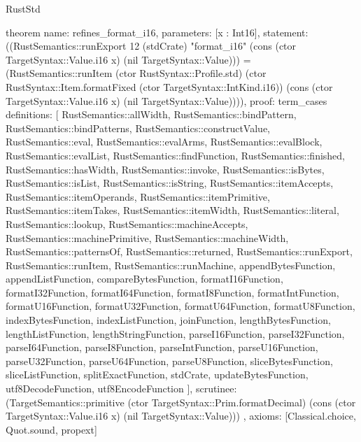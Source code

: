 \begin{lexlean}{RustStd}
\begin{semanticmodule}
theorem{
  name: refines_format_i16,
  parameters: [x : Int16],
  statement: ((RustSemantics::runExport 12 (stdCrate) "format_i16" (cons (ctor TargetSyntax::Value.i16 x) (nil TargetSyntax::Value))) = (RustSemantics::runItem (ctor RustSyntax::Profile.std) (ctor RustSyntax::Item.formatFixed (ctor TargetSyntax::IntKind.i16)) (cons (ctor TargetSyntax::Value.i16 x) (nil TargetSyntax::Value)))),
  proof: term_cases{
    definitions: [
      RustSemantics::allWidth,
      RustSemantics::bindPattern,
      RustSemantics::bindPatterns,
      RustSemantics::constructValue,
      RustSemantics::eval,
      RustSemantics::evalArms,
      RustSemantics::evalBlock,
      RustSemantics::evalList,
      RustSemantics::findFunction,
      RustSemantics::finished,
      RustSemantics::hasWidth,
      RustSemantics::invoke,
      RustSemantics::isBytes,
      RustSemantics::isList,
      RustSemantics::isString,
      RustSemantics::itemAccepts,
      RustSemantics::itemOperands,
      RustSemantics::itemPrimitive,
      RustSemantics::itemTakes,
      RustSemantics::itemWidth,
      RustSemantics::literal,
      RustSemantics::lookup,
      RustSemantics::machineAccepts,
      RustSemantics::machinePrimitive,
      RustSemantics::machineWidth,
      RustSemantics::patternsOf,
      RustSemantics::returned,
      RustSemantics::runExport,
      RustSemantics::runItem,
      RustSemantics::runMachine,
      appendBytesFunction,
      appendListFunction,
      compareBytesFunction,
      formatI16Function,
      formatI32Function,
      formatI64Function,
      formatI8Function,
      formatIntFunction,
      formatU16Function,
      formatU32Function,
      formatU64Function,
      formatU8Function,
      indexBytesFunction,
      indexListFunction,
      joinFunction,
      lengthBytesFunction,
      lengthListFunction,
      lengthStringFunction,
      parseI16Function,
      parseI32Function,
      parseI64Function,
      parseI8Function,
      parseIntFunction,
      parseU16Function,
      parseU32Function,
      parseU64Function,
      parseU8Function,
      sliceBytesFunction,
      sliceListFunction,
      splitExactFunction,
      stdCrate,
      updateBytesFunction,
      utf8DecodeFunction,
      utf8EncodeFunction
    ],
    scrutinee: (TargetSemantics::primitive (ctor TargetSyntax::Prim.formatDecimal) (cons (ctor TargetSyntax::Value.i16 x) (nil TargetSyntax::Value)))
  },
  axioms: [Classical.choice, Quot.sound, propext]
}


\end{semanticmodule}
\end{lexlean}
